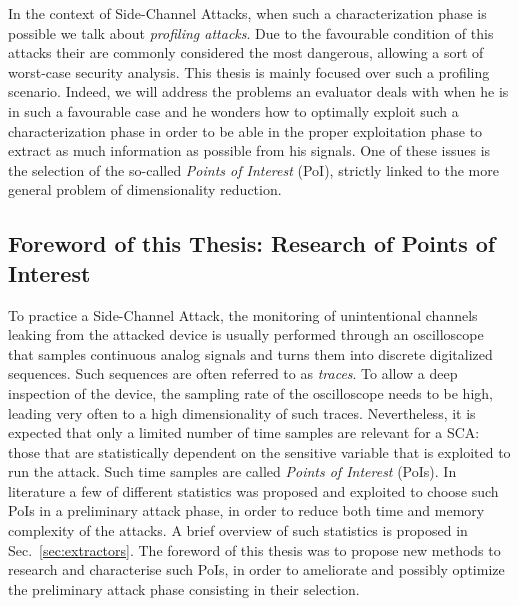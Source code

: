In the context of Side-Channel Attacks, when such a characterization phase is possible we talk about \emph{profiling attacks}. Due to the favourable condition of this attacks their are commonly considered the most dangerous, allowing a sort of worst-case security analysis. This thesis is mainly focused over such a profiling scenario. Indeed, we will address the problems an evaluator deals with when he is in such a favourable case and he wonders how to optimally exploit such a characterization phase in order to be able in the proper exploitation phase to extract as much information as possible from his signals. One of these issues is the selection of the so-called \emph{Points of Interest} (PoI), strictly linked to the more general problem of dimensionality reduction.

\subsection{Foreword of this Thesis: Research of Points of Interest}
To practice a Side-Channel Attack, the monitoring of unintentional channels leaking from the attacked device is usually performed through an oscilloscope that samples continuous analog signals and turns them into discrete digitalized sequences. Such sequences are often referred to as \emph{traces}. To allow a deep inspection of the device, the sampling rate of the oscilloscope needs to be high, leading very often to a high dimensionality of such traces. Nevertheless,  it is expected that only a limited number of time samples are relevant for a SCA: those that are statistically dependent on the sensitive variable that is exploited to run the attack. Such time samples are called \emph{Points of Interest} (PoIs). In literature a few of different statistics was proposed and exploited to choose such PoIs in a preliminary attack phase, in order to reduce both time and memory complexity of the attacks. A brief overview of such statistics is proposed in Sec.~\ref{sec:extractors}. The foreword of this thesis was to propose new methods to research and characterise such PoIs, in order to ameliorate and possibly optimize the preliminary attack phase consisting in their selection. 

